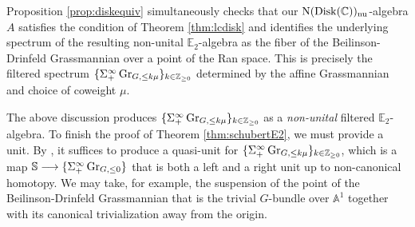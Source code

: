 Proposition \ref{prop:diskequiv} simultaneously checks that our $\operatorname{\mathrm{N}} (\mathrm{Disk}(\mathbb{C}))_{\mathrm{nu}}$-algebra $A$ satisfies the condition of Theorem \ref{thm:lcdisk} and identifies the underlying spectrum of the resulting non-unital $\mathbb{E}_2$-algebra as the fiber of the Beilinson-Drinfeld Grassmannian over a point of the Ran space.  This is precisely the filtered spectrum $\{ \Sigma^{\infty}_+ \operatorname{\mathrm{Gr}}_{G,\leq k\mu}\}_{k \in \mathbb{Z}_{\geq 0}}$ determined by the affine Grassmannian and choice of coweight $\mu$.  

The above discussion produces $\{ \Sigma^{\infty}_+ \operatorname{\mathrm{Gr}}_{G,\leq k\mu}\}_{k \in \mathbb{Z}_{\geq 0}}$ as a \textit{non-unital} filtered $\mathbb{E}_2$-algebra.  To finish the proof of Theorem \ref{thm:schubertE2}, we must provide a unit.  By \cite[Theorem 5.4.4.5]{HA}, it suffices to produce a quasi-unit for $\{ \Sigma^{\infty}_+ \operatorname{\mathrm{Gr}}_{G,\leq k\mu}\}_{k \in \mathbb{Z}_{\geq 0}}$, which is a map $\mathbb{S} \longrightarrow \{ \Sigma^{\infty}_+ \operatorname{\mathrm{Gr}}_{G,\leq 0}\}$ that is both a left and a right unit up to non-canonical homotopy.  We may take, for example, the suspension of the point of the Beilinson-Drinfeld Grassmannian that is the trivial $G$-bundle over $\mathbb{A}^1$ together with its canonical trivialization away from the origin.
